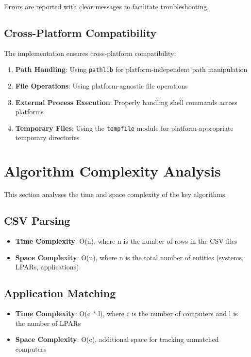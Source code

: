 \documentclass[a4paper,12pt]{article}
\begin{document}
Errors are reported with clear messages to facilitate troubleshooting.

\subsection{Cross-Platform Compatibility}

The implementation ensures cross-platform compatibility:

\begin{enumerate}
    \item \textbf{Path Handling}: Using \texttt{pathlib} for platform-independent path manipulation
    \item \textbf{File Operations}: Using platform-agnostic file operations
    \item \textbf{External Process Execution}: Properly handling shell commands across platforms
    \item \textbf{Temporary Files}: Using the \texttt{tempfile} module for platform-appropriate temporary directories
\end{enumerate}

\section{Algorithm Complexity Analysis}

This section analyses the time and space complexity of the key algorithms.

\subsection{CSV Parsing}

\begin{itemize}
    \item \textbf{Time Complexity}: O(n), where n is the number of rows in the CSV files
    \item \textbf{Space Complexity}: O(n), where n is the total number of entities (systems, LPARs, applications)
\end{itemize}

\subsection{Application Matching}

\begin{itemize}
    \item \textbf{Time Complexity}: O(c * l), where c is the number of computers and l is the number of LPARs
    \item \textbf{Space Complexity}: O(c), additional space for tracking unmatched computers
\end{itemize}
\end{document}
